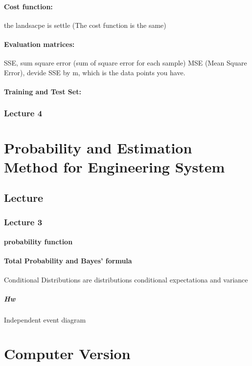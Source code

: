 \documentclass[a4paper]{article}
\begin{document}
\paragraph{Cost function:}
the landsacpe is settle (The cost function is the same)
\paragraph{Evaluation matrices:}
SSE, sum square error (sum of square error for each sample)
MSE (Mean Square Error), devide SSE by m, which is the data points you have. 
\paragraph{Training and Test Set:}

\subsubsection{Lecture 4}


\section{Probability and Estimation Method for Engineering System}
\subsection{Lecture}
\subsubsection{Lecture 3}
\paragraph{probability function}
\paragraph{Total Probability and Bayes' formula}
Conditional Distributions are distributions
conditional expectationa and variance
\subparagraph{Hw}
Independent event diagram

\section{Computer Version}
\end{document}
